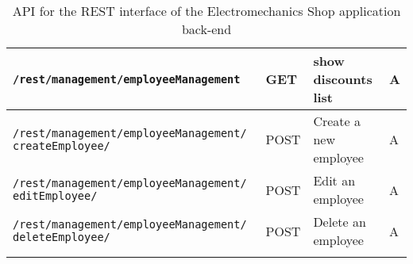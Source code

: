 \begin{longtable}{|p{}|p{} |p{}|p{}|}

\texttt{/rest/management/employeeManagement} & GET & show discounts list & A\\\hline
\texttt{/rest/management/employeeManagement/} \texttt{createEmployee/}& POST & Create a new employee & A\\\hline
\texttt{/rest/management/employeeManagement/} \texttt{editEmployee/} & POST & Edit an employee & A\\\hline
\texttt{/rest/management/employeeManagement/} \texttt{deleteEmployee/} & POST & Delete an employee & A\\\hline



\caption{API for the REST interface of the Electromechanics
Shop application back-end}
\label{tab:ApiRest}
\end{longtable}